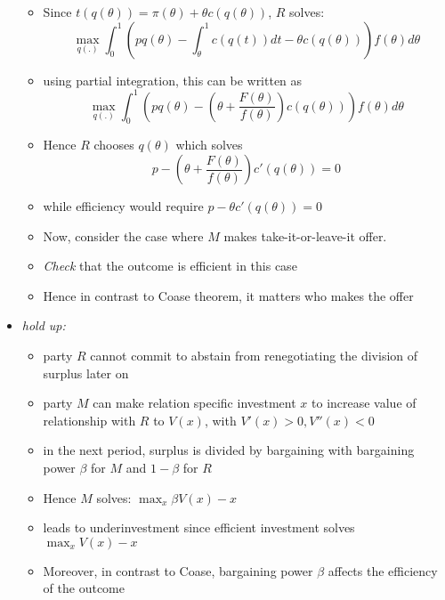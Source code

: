 \documentclass[11pt,english]{beamer}
\begin{document}
\begin{frame}[allowframebreaks]
\begin{itemize}
\begin{itemize}
\begin{equation*}
    \end{equation*}
  \item Since $t(q(\theta))=\pi(\theta)+\theta c(q(\theta))$, $R$ solves:
    \begin{equation*}
      \max_{q(.)} \int_0^1 (pq(\theta)-\int_\theta^1 c(q(t))dt -\theta c(q(\theta)))f(\theta)d\theta
    \end{equation*}
  \item using partial integration, this can be written as
    \begin{equation*}
      \max_{q(.)} \int_0^1
      (pq(\theta)-\left(\theta+\frac{F(\theta)}{f(\theta)} \right) c(q(\theta)))f(\theta)d\theta
    \end{equation*}
  \item Hence $R$ chooses $q(\theta)$ which solves
    \begin{equation*}
      p-\left(\theta+\frac{F(\theta)}{f(\theta)} \right) c'(q(\theta))=0
    \end{equation*}
  \item while efficiency would require $p-\theta c'(q(\theta)) =0$
  \item Now, consider the case where $M$ makes take-it-or-leave-it
    offer.
  \item \emph{Check} that the outcome is efficient in this case
  \item Hence in contrast to Coase theorem, it matters who makes the offer
    \end{itemize}
  \item \emph{hold up:}
    \begin{itemize}
    \item party $R$ cannot commit to abstain from renegotiating the division
      of surplus later on
    \item party $M$ can make relation specific investment $x$ to
    increase value of relationship with $R$ to $V(x)$, with $V'(x)>0, V''(x)<0$
  \item in the next period, surplus is divided by bargaining with bargaining
    power $\beta$ for $M$ and $1-\beta$ for $R$
  \item Hence $M$ solves: $\max_x \beta V(x) - x$
  \item leads to underinvestment since efficient investment solves
    $\max_x V(x) -x$
  \item Moreover, in contrast to Coase, bargaining power $\beta$
    affects the efficiency of the outcome
    \end{itemize}
  \end{itemize} %
\end{frame}
\end{document}
